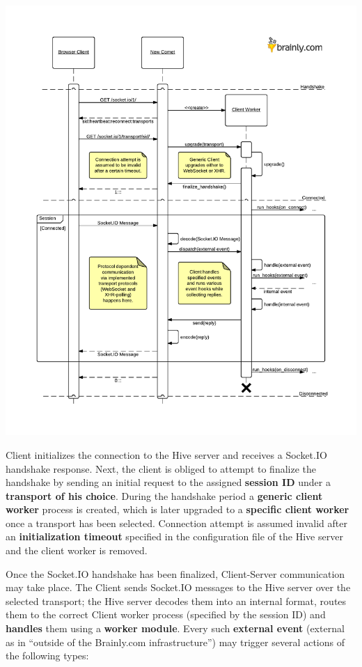 \documentclass[a4paper]{article}
\begin{document}
\begin{center}
\includegraphics[scale=0.8]{./img/client_server.pdf}
\end{center}

\noindent
Client initializes the connection to the Hive server and receives a Socket.IO handshake response. Next, the client is obliged to attempt to finalize the handshake by sending an initial request to the assigned \textbf{session ID} under a \textbf{transport of his choice}. During the handshake period a \textbf{generic client worker} process is created, which is later upgraded to a \textbf{specific client worker} once a transport has been selected. Connection attempt is assumed invalid after an \textbf{initialization timeout} specified in the configuration file of the Hive server and the client worker is removed.

Once the Socket.IO handshake has been finalized, Client-Server communication may take place. The Client sends Socket.IO messages to the Hive server over the selected transport; the Hive server decodes them into an internal format, routes them to the correct Client worker process (specified by the session ID) and \textbf{handles} them using a \textbf{worker module}. Every such \textbf{external event} (external as in ``outside of the Brainly.com infrastructure'') may trigger several actions of the following types:
\end{document}
